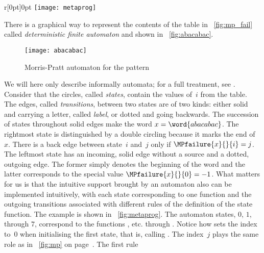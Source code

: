 %
\setlength{\intextsep}{0pt}
\begin{wrapfigure}[29]{r}[0pt]{0pt}
\centering
\texttt{[image: metaprog]}
\caption{Factoring } %
\label{fig:metaprog}
\end{wrapfigure}
There is a graphical way to represent the contents of the table in
\fig~\vref{fig:mp_fail} called \emph{deterministic finite automaton}
  and shown in
\fig~\vref{fig:abacabac}.
\begin{figure}[b]
\centering
\texttt{[image: abacabac]}
\caption{Morris-Pratt automaton for the pattern }
\label{fig:abacabac}
\end{figure}
We will here only describe informally automata; for a full treatment,
see \cite{VanLeeuwen_1990c, HopcroftMotwaniUllman_2003,
  Sakarovitch_2003}. Consider that the circles, called
\emph{states}, contain the values of~\(i\) from the
table. The edges, called \emph{transitions}, between
two states are of two kinds: either solid and carrying a letter,
called \emph{label}, or dotted and going backwards. The
succession of states throughout solid edges make the word
\(x=\word{abacabac}\). The rightmost state is distinguished by a
double circling because it marks the end of~\(x\). There is a back
edge between state~\(i\) and~\(j\) only if \(\MPfailure{x}{}{i} = j\).
The leftmost state has an incoming, solid edge without a source and a
dotted, outgoing edge. The former simply denotes the beginning of the
word and the latter corresponds to the special value
\(\MPfailure{x}{}{0} = -1\).  What matters for us is that the
intuitive support brought by an automaton also can be implemented
intuitively, with each state corresponding to one function and the
outgoing transitions associated with different rules of the definition
of the state function. The example  is shown in
\fig~\ref{fig:metaprog}. The automaton states, \(0\), \(1\), through
\(7\), correspond to the functions , 
etc. through . Notice how
 sets the index to~\(0\)
when initialising the first state, that is, calling
. The index~\(j\) plays the same
role as in \fig~\ref{fig:mp} on page~\pageref{fig:mp}. The first rule
